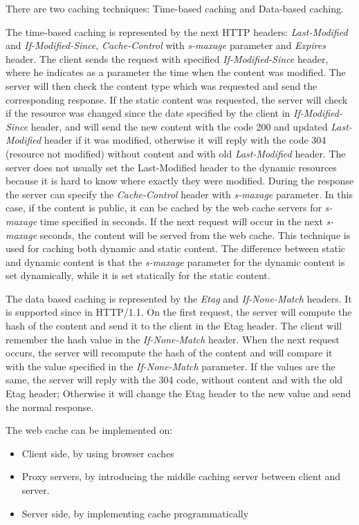 There are two caching techniques: Time-based caching and Data-based caching.

The time-based caching is represented by the next HTTP headers: \textit{Last-Modified} and \textit{If-Modified-Since}, \textit{Cache-Control} with \textit{s-maxage} parameter and \textit{Expires} header. The client sends the request with specified \textit{If-Modified-Since} header, where he indicates as a parameter the time when the content was modified. The server will then check the content type which was requested and send the corresponding response. If the static content was requested, the server will check if the resource was changed since the date specified by the client in \textit{If-Modified-Since} header, and will send the new content with the code 200 and updated \textit{Last-Modified} header if it was modified, otherwise it will reply with the code 304 (resource not modified) without content and with old \textit{Last-Modified} header. The server does not usually set the Last-Modified header to the dynamic resources because it is hard to know where exactly they were modified. 
During the response the server can specify the \textit{Cache-Control} header with \textit{s-maxage} parameter. In this case, if the content is public, it can be cached by the web cache servers for \textit{s-maxage} time specified in seconds. If the next request will occur in the next \textit{s-maxage} seconds, the content will be served from the web cache. This technique is used for caching both dynamic and static content. The difference between static and dynamic content is that the \textit{s-maxage} parameter for the dynamic content is set dynamically, while it is set statically for the static content.

The data based caching is represented by the \textit{Etag} and \textit{If-None-Match} headers. It is supported since in HTTP/1.1. On the first request, the server will compute the hash of the content and send it to the client in the Etag header. The client will remember the hash value in the \textit{If-None-Match} header. When the next request occurs, the server will recompute the hash of the content and will compare it with the value specified in the \textit{If-None-Match} parameter. If the values are the same, the server will reply with the 304 code, without content and with the old Etag header; Otherwise it will change the Etag header to the new value and send the normal response. 


The web cache can be implemented on: 

\begin{itemize}
    \item Client side, by using browser caches
    \item Proxy servers, by introducing the middle caching server between client and server.
    \item Server side, by implementing cache programmatically
\end{itemize}

